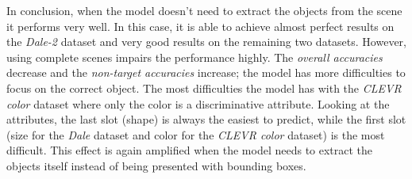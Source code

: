 In conclusion, when the model doesn't need to extract the objects from the scene it performs very well.
In this case, it is able to achieve almost perfect results on the \emph{Dale-2} dataset and very good results on the remaining two datasets.
However, using complete scenes impairs the performance highly.
The \emph{overall accuracies} decrease and the \emph{non-target accuracies} increase; the model has more difficulties to focus on the correct object.
The most difficulties the model has with the \emph{CLEVR color} dataset where only the color is a discriminative attribute.
Looking at the attributes, the last slot (shape) is always the easiest to predict, while the first slot (size for the \emph{Dale} dataset and color for the \emph{CLEVR color} dataset) is the most difficult.
This effect is again amplified when the model needs to extract the objects itself instead of being presented with bounding boxes.

